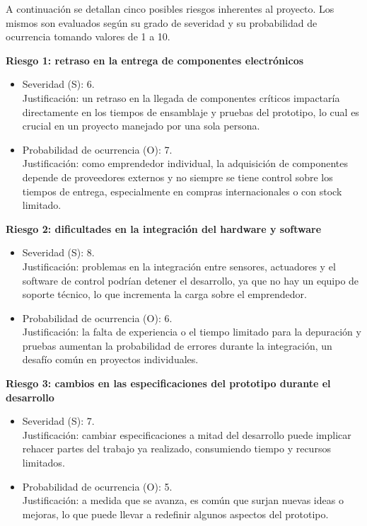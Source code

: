 \documentclass[
11pt, %
]{charter}
\begin{document}
 





A continuación se detallan cinco posibles riesgos inherentes al proyecto. Los mismos son
evaluados según su grado de severidad y su probabilidad de ocurrencia tomando valores de
1 a 10.

\textbf{Riesgo 1: retraso en la entrega de componentes electrónicos}
\begin{itemize}
    \item Severidad (S): 6.\\
    Justificación: un retraso en la llegada de componentes críticos impactaría directamente en los tiempos de ensamblaje y pruebas del prototipo, lo cual es crucial en un proyecto manejado por una sola persona.
    \item Probabilidad de ocurrencia (O): 7.\\
    Justificación: como emprendedor individual, la adquisición de componentes depende de proveedores externos y no siempre se tiene control sobre los tiempos de entrega, especialmente en compras internacionales o con stock limitado.
\end{itemize}

\textbf{Riesgo 2: dificultades en la integración del hardware y software}
\begin{itemize}
    \item Severidad (S): 8.\\
    Justificación: problemas en la integración entre sensores, actuadores y el software de control podrían detener el desarrollo, ya que no hay un equipo de soporte técnico, lo que incrementa la carga sobre el emprendedor.
    \item Probabilidad de ocurrencia (O): 6.\\
    Justificación: la falta de experiencia o el tiempo limitado para la depuración y pruebas aumentan la probabilidad de errores durante la integración, un desafío común en proyectos individuales.
\end{itemize}

\textbf{Riesgo 3: cambios en las especificaciones del prototipo durante el desarrollo}
\begin{itemize}
    \item Severidad (S): 7.\\
    Justificación: cambiar especificaciones a mitad del desarrollo puede implicar rehacer partes del trabajo ya realizado, consumiendo tiempo y recursos limitados.
    \item Probabilidad de ocurrencia (O): 5.\\
    Justificación: a medida que se avanza, es común que surjan nuevas ideas o mejoras, lo que puede llevar a redefinir algunos aspectos del prototipo.
\end{itemize}
\end{document}
